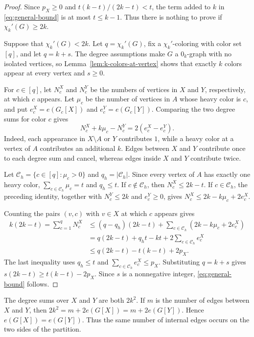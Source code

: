 \documentclass[11pt]{article}
\newcommand{\chik}{\chi_k'}
\begin{document}
\begin{proof}
Since $p_X\geq0$ and $t(k-t)/(2k-t)<t$, the term added to $k$ in
\eqref{eq:general-bound} is at most $t\leq k-1$. Thus there is nothing
to prove if $\chik(G)\geq2k$.

Suppose that $\chik(G)<2k$. Let $q=\chik(G)$, fix a
$\chi_k'$-coloring with color set $[q]$, and let $q=k+s$. The degree
assumptions make $G$ a $0_k$-graph with no isolated vertices, so
Lemma~\ref{lem:k-colors-at-vertex} shows that exactly $k$ colors appear
at every vertex and $s\geq0$.

For $c\in[q]$, let $N_c^X$ and $N_c^Y$ be the numbers of vertices in
$X$ and $Y$, respectively, at which $c$ appears. Let $\mu_c$ be the
number of vertices in $A$ whose heavy color is $c$, and put
$e_c^X=e(G_c[X])$ and $e_c^Y=e(G_c[Y])$. Comparing the two degree sums
for color $c$ gives
\[
N_c^X+k\mu_c-N_c^Y=2(e_c^X-e_c^Y).
\]
Indeed, each appearance in $X\setminus A$ or $Y$ contributes $1$, while
a heavy color at a vertex of $A$ contributes an additional $k$. Edges
between $X$ and $Y$ contribute once to each degree sum and cancel,
whereas edges inside $X$ and $Y$ contribute twice.

Let $\mathcal C_h=\{c\in[q]:\mu_c>0\}$ and
$q_h=|\mathcal C_h|$. Since every vertex of $A$ has exactly one heavy
color, $\sum_{c\in\mathcal C_h}\mu_c=t$ and $q_h\leq t$. If
$c\notin\mathcal C_h$, then $N_c^X\leq2k-t$. If
$c\in\mathcal C_h$, the preceding identity, together with
$N_c^Y\leq2k$ and $e_c^Y\geq0$, gives
$N_c^X\leq2k-k\mu_c+2e_c^X$.

Counting the pairs $(v,c)$ with $v\in X$ at which $c$ appears gives
\begin{align*}
k(2k-t)=\sum_{c=1}^{q}N_c^X
&\leq (q-q_h)(2k-t)
 +\sum_{c\in\mathcal C_h}(2k-k\mu_c+2e_c^X)\\
&=q(2k-t)+q_ht-kt
 +2\sum_{c\in\mathcal C_h}e_c^X\\
&\leq q(2k-t)-t(k-t)+2p_X.
\end{align*}
The last inequality uses $q_h\leq t$ and
$\sum_{c\in\mathcal C_h}e_c^X\leq p_X$. Substituting $q=k+s$ gives
$s(2k-t)\geq t(k-t)-2p_X$. Since $s$ is a nonnegative integer,
\eqref{eq:general-bound} follows.
\end{proof}

The degree sums over $X$ and $Y$ are both $2k^2$. If $m$ is the number
of edges between $X$ and $Y$, then
$2k^2=m+2e(G[X])=m+2e(G[Y])$. Hence
$e(G[X])=e(G[Y])$. Thus the same number of internal edges occurs on the
two sides of the partition.
\end{document}
